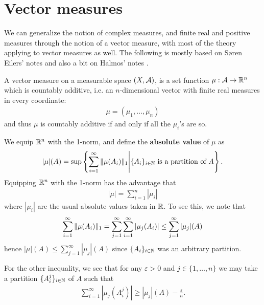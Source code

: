 \section{Vector measures}

We can generalize the notion of complex measures, and finite real and positive measures through the notion of a vector measure, with most of the theory applying to vector measures as well. The following is mostly based on Søren Eilers' notes \cite{BergEilers} %
and also a bit on Halmos' notes \cite{Halmos}.



\begin{definition} %
A vector measure on a measurable space $(X, \m{A})$, is a set function $\mu:\m{A} \to \R^{n}$ which is countably additive, i.e. an $n$-dimensional vector with finite real measures in every coordinate:
\begin{align*}
	\mu=(\mu_{1}, \dots, \mu_{n})
\end{align*}
and thus $\mu$ is countably additive if and only if all the $\mu_{i}$'s are so.
\end{definition}



We equip $\R^{n}$ with the 1-norm, and define the \textbf{absolute value} of $\mu$ as
\begin{align*}
	| \mu | (A) = \sup \left\{ \sum_{i=1}^{\infty} \norm[1]{\mu(A_{i})} \middle| \{ A_{i} \}_{i\in \N} \text{ is a partition of } A \right\}.
\end{align*}
Equipping $\R^{n}$ with the 1-norm has the advantage that
\begin{align}
	|\mu | = \sum_{i=1}^{n} |\mu_{i}| \label{eq: one norm}
\end{align}
where $|\mu_{i}|$ are the usual absolute values taken in $\R$. To see this, we note that
\begin{align*}
	\sum_{i=1}^{\infty} \norm[1]{\mu(A_{i})} = \sum_{j=1}^{\infty} \sum_{i=1}^{\infty} | \mu_{j}(A_{i}) | \le \sum_{j=1}^{\infty} |\mu_{j}|(A)
\end{align*}
hence $|\mu|(A) \le \sum_{j=1}^{\infty} |\mu_{j}|(A)$ since $\{A_{i}\}_{i\in \N}$ was an arbitrary partition.

For the other inequality, we see that for any $\varepsilon>0$ and $j\in \{1, \dots, n\}$ we may take a partition $\{A_{i}^{j}\}_{i\in \N}$ of $A$ such that
\begin{align*}
	\sum_{i=1}^{\infty} | \mu_{j}(A_{i}^{j}) | \ge | \mu_{j}| (A) - \frac{\varepsilon}{n}.
\end{align*}

